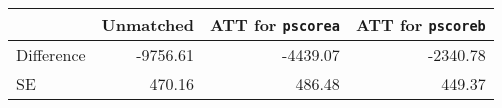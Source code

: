 \begin{table}[h!]
\begin{center}
\begin{tabular}{lrrr}
\toprule
& Unmatched & ATT for \texttt{pscorea} & ATT for \texttt{pscoreb}  \\
\hline
Difference & -9756.61 & -4439.07 & -2340.78 \\
SE & 470.16 & 486.48 & 449.37 \\
\bottomrule
\end{tabular}
\end{center}
\end{table}
